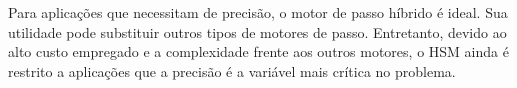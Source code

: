 Para aplicações que necessitam de precisão, o motor de passo híbrido é ideal. Sua utilidade pode substituir outros tipos de motores de passo. Entretanto, devido ao alto custo empregado e a complexidade frente aos outros motores, o HSM ainda é restrito a aplicações que a precisão é a variável mais crítica no problema.